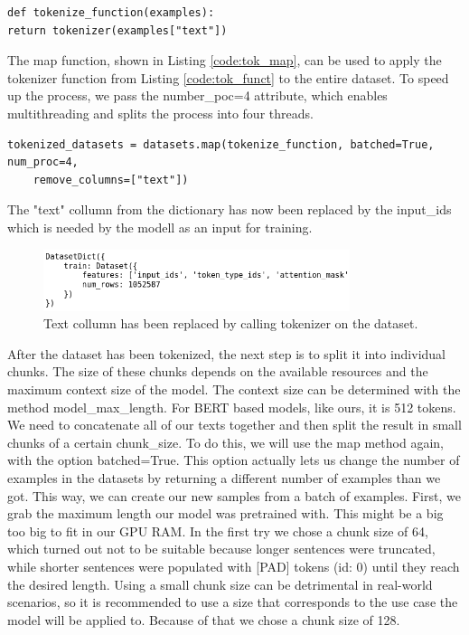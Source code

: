 \begin{code}
	\label{code:tok_funct}
	\begin{verbatim}
def tokenize_function(examples):
return tokenizer(examples["text"])
	\end{verbatim}
\end{code}

The map function, shown in Listing \ref{code:tok_map}, can be used to apply the tokenizer function from Listing \ref{code:tok_funct} to the entire dataset. To speed up the process, we pass the number\_poc=4 attribute, which enables multithreading and splits the process into four threads.

\begin{code}
	\label{code:tok_map}
	\begin{verbatim}
tokenized_datasets = datasets.map(tokenize_function, batched=True, num_proc=4, 
	remove_columns=["text"])
	\end{verbatim}
\end{code}

The "text" collumn from the dictionary has now been replaced by the input\_ids which is needed by the modell as an input for training.

\begin{figure}[H]
	\centering
	\includegraphics[width=0.8\textwidth]{figures/tok_dataset.png}
	\caption{Text collumn has been replaced by calling tokenizer on the dataset.}
	\label{fig:dict_tokenized}
\end{figure}

After the dataset has been tokenized, the next step is to split it into individual chunks. The size of these chunks depends on the available resources and the maximum context size of the model. The context size can be determined with the method \alert{model\_max\_length}. For BERT based models, like ours, it is 512 tokens.
We need to concatenate all of our texts together and then split the result in small chunks of a certain \alert{chunk\_size}. To do this, we will use the \alert{map} method again, with the option \alert{batched=True}. This option actually lets us change the number of examples in the datasets by returning a different number of examples than we got. This way, we can create our new samples from a batch of examples.\newline
First, we grab the maximum length our model was pretrained with. This might be a big too big to fit in our GPU RAM. In the first try we chose a chunk size of 64, which turned out not to be suitable because longer sentences were truncated, while shorter sentences were populated with [PAD] tokens (id: 0) until they reach the desired length. Using a small chunk size can be detrimental in real-world scenarios, so it is recommended to use a size that corresponds to the use case the model will be applied to. Because of that we chose a chunk size of 128.

